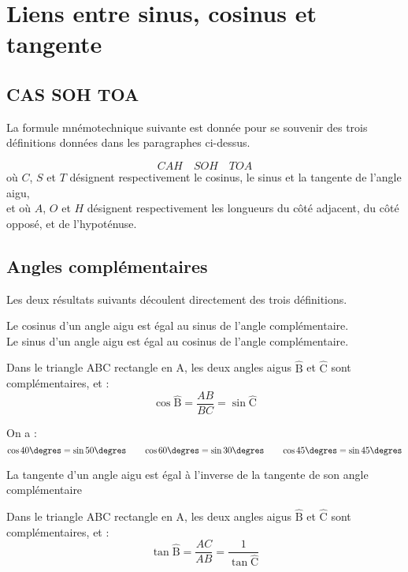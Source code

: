 \section{Liens entre sinus, cosinus et tangente}
	\subsection{CAS SOH TOA}
	
La formule mnémotechnique suivante est donnée pour se souvenir des trois définitions données dans les paragraphes ci-dessus.

\[CAH\quad SOH\quad TOA\]
où $C$, $S$ et $T$ désignent respectivement le cosinus, le sinus et la tangente de l'angle aigu,\\
et où $A$, $O$ et $H$ désignent respectivement les longueurs du côté adjacent, du côté opposé, et de l'hypoténuse. 
	
	\subsection{Angles complémentaires}
	
Les deux résultats suivants découlent directement des trois définitions.

\begin{propriete}
Le cosinus d'un angle aigu est égal au sinus de l'angle complémentaire.\\
Le sinus d'un angle aigu est égal au cosinus de l'angle complémentaire.
\end{propriete}	

\begin{preuve}
Dans le triangle ABC rectangle en A, les deux angles aigus $\hat{\mbox{B}}$ et $\hat{\mbox{C}}$ sont complémentaires, et :
\[\cos \hat{\mbox{B}} = \dfrac{AB}{BC} = \sin \hat{\mbox{C}}\]
\end{preuve}

\begin{exemple}
On a :
\[\cos 40\degres = \sin 50\degres\qquad \cos60\degres=\sin 30\degres\qquad \cos45\degres=\sin45\degres\]
\end{exemple}
	
	
\begin{propriete}
La tangente d'un angle aigu est égal à l'inverse de la tangente de son angle complémentaire
\end{propriete}	

\begin{preuve}
Dans le triangle ABC rectangle en A, les deux angles aigus $\hat{\mbox{B}}$ et $\hat{\mbox{C}}$ sont complémentaires, et :
\[\tan \hat{\mbox{B}} = \dfrac{AC}{AB} = \dfrac{1}{\tan \hat{\mbox{C}}}\]
\end{preuve}

